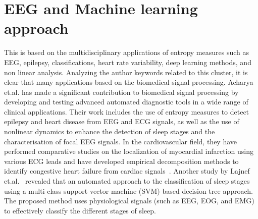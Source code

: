 \section{EEG and Machine learning approach}\label{Sec:ReviewTopicEEG}
This is based on the multidisciplinary applications of entropy measures such as EEG, epilepsy, classifications, heart rate variability, deep learning methods, and non linear analysis. Analyzing the author keywords related to this cluster, it is clear that many applications based on the biomedical signal processing. 
Acharya et.al. has made a significant contribution to biomedical signal processing by developing and testing advanced automated diagnostic tools in a wide range of clinical applications. Their work includes the use of entropy measures to detect epilepsy and heart disease from EEG and ECG signals, as well as the use of nonlinear dynamics to enhance the detection of sleep stages and the characterisation of focal EEG signals. In the cardiovascular field, they have performed comparative studies on the localization of myocardial infarction using various ECG leads and have developed empirical decomposition methods to identify congestive heart failure from cardiac signals~\cite{Acharya2015, Acharya2015a, Acharya2016, Acharya2017, Acharya2017a, Acharya2018, Acharya2019}. Another study by Lajnef et.al.~\cite{Lajnef2015} revealed that an automated approach to the classification of sleep stages using a multi-class support vector machine (SVM) based decision tree approach. The proposed method uses physiological signals (such as EEG, EOG, and EMG) to effectively classify the different stages of sleep.


